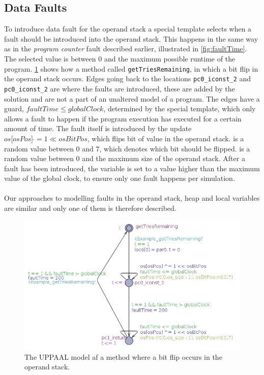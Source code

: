 \subsection{Data Faults}
To introduce data fault for the operand stack a special template selects when a fault should be introduced into the operand stack. 
This happens in the same way as in the \textit{program counter} fault described earlier, illustrated in \cref{fig:faultTime}. 
The selected value is between $0$ and the maximum possible runtime of the program.
\cref{fig:opstackFlip} shows how a method called \texttt{getTriesRemaining}, in which a bit flip in the operand stack occurs.
Edges going back to the locations \texttt{pc0\_iconst\_2} and \texttt{pc0\_iconst\_2} are where the faults are introduced, these are added by the solution and are not a part of an unaltered model of a program. 
The edges have a guard, $faultTime \leq globalClock$, determined by the special template, which only allows a fault to happen if the program execution has executed for a certain amount of time. 
The fault itself is introduced by the update $os\lbrack osPos \rbrack\:\hat{}= 1 \ll osBitPos$, which flips bit  of value  in the operand stack.
 is a random value between $0$ and $7$, which denotes which bit should be flipped.  is a random value between $0$ and the maximum size of the operand stack. 
After a fault has been introduced, the variable  is set to a value higher than the maximum value of the global clock, to ensure only one fault happens per simulation.\\\\
Our approaches to modelling faults in the operand stack, heap and local variables are similar and only one of them is therefore described.
\begin{figure}[H]
\centering
\includegraphics[width=\textwidth]{figures/reportExamples/opstackRewrite.png}
\caption{The UPPAAL model af a method where a bit flip occurs in the operand stack.}
\label{fig:opstackFlip}
\end{figure}
